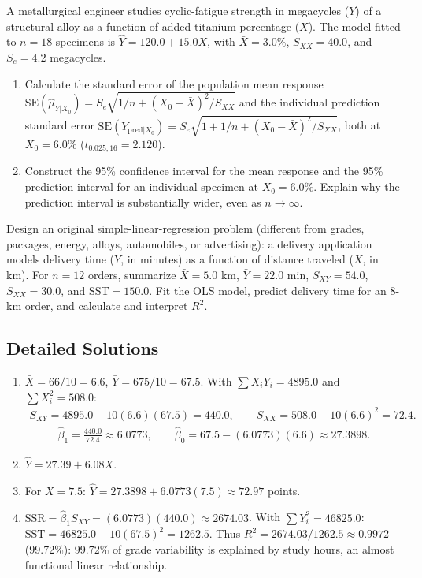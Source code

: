 \begin{problema}
\label{prob:5c55133}
A metallurgical engineer studies cyclic-fatigue strength in megacycles ($Y$) of a structural alloy as a function of added titanium percentage ($X$). The model fitted to $n=18$ specimens is $\hat Y=120.0+15.0X$, with $\bar X=3.0\%$, $S_{XX}=40.0$, and $S_e=4.2$ megacycles.
\begin{enumerate}
\item Calculate the standard error of the population mean response $\text{SE}(\hat\mu_{Y|X_0})=S_e\sqrt{1/n+(X_0-\bar X)^2/S_{XX}}$ and the individual prediction standard error $\text{SE}(Y_{\text{pred}|X_0})=S_e\sqrt{1+1/n+(X_0-\bar X)^2/S_{XX}}$, both at $X_0=6.0\%$ ($t_{0.025,16}=2.120$).
\item Construct the 95\% confidence interval for the mean response and the 95\% prediction interval for an individual specimen at $X_0=6.0\%$. Explain why the prediction interval is substantially wider, even as $n\to\infty$.
\end{enumerate}
\end{problema}

\begin{problema}
\label{prob:58d3723}
Design an original simple-linear-regression problem (different from grades, packages, energy, alloys, automobiles, or advertising): a delivery application models delivery time ($Y$, in minutes) as a function of distance traveled ($X$, in km). For $n=12$ orders, summarize $\bar X=5.0$ km, $\bar Y=22.0$ min, $S_{XY}=54.0$, $S_{XX}=30.0$, and $\text{SST}=150.0$. Fit the OLS model, predict delivery time for an 8-km order, and calculate and interpret $R^2$.
\end{problema}

\subsection*{Detailed Solutions}

\begin{solproblema}[prob:ab5bf4a]
\begin{enumerate}
\item $\bar X=66/10=6.6$, $\bar Y=675/10=67.5$. With $\sum X_iY_i=4895.0$ and $\sum X_i^2=508.0$:
\begin{align}
S_{XY}=4895.0-10(6.6)(67.5)=440.0,\qquad S_{XX}=508.0-10(6.6)^2=72.4.
\end{align}
\begin{align}
\hat\beta_1=\frac{440.0}{72.4}\approx6.0773,\qquad \hat\beta_0=67.5-(6.0773)(6.6)\approx27.3898.
\end{align}
\item $\hat Y=27.39+6.08X$.
\item For $X=7.5$: $\hat Y=27.3898+6.0773(7.5)\approx72.97$ points.
\item $\text{SSR}=\hat\beta_1S_{XY}=(6.0773)(440.0)\approx2674.03$. With $\sum Y_i^2=46825.0$: $\text{SST}=46825.0-10(67.5)^2=1262.5$. Thus $R^2=2674.03/1262.5\approx0.9972$ (99.72\%): 99.72\% of grade variability is explained by study hours, an almost functional linear relationship.
\end{enumerate}
\end{solproblema}

